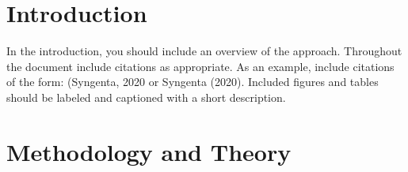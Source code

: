 \documentclass[syngen,nonblindrev]{informs3-syngen}
\begin{document}
%


\section{Introduction}

In the introduction, you should include an overview of the approach. Throughout the document include citations as appropriate. As an example, include citations of the form: (Syngenta, 2020 or Syngenta (2020). Included figures and tables should be labeled and captioned with a short description.


\section{Methodology and Theory}
\end{document}
